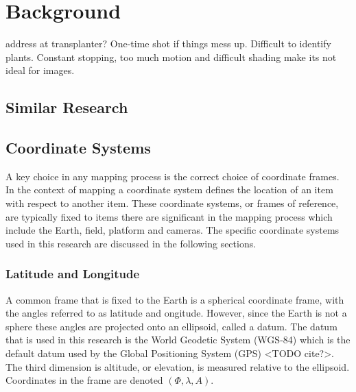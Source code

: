 
\cleardoublepage

\chapter{Background}
\label{background}

address at transplanter?  One-time shot if things mess up.  Difficult to identify plants.  Constant stopping, too much motion and difficult shading make its not ideal for images. 

\section{Similar Research}


\section{Coordinate Systems}

A key choice in any mapping process is the correct choice of coordinate frames.  In the context of mapping a coordinate system defines the location of an item with respect to another item.  These coordinate systems, or frames of reference, are typically fixed to items there are significant in the mapping process which include the Earth, field, platform and cameras.  The specific coordinate systems used in this research are discussed in the following sections.

\subsection{Latitude and Longitude}

A common frame that is fixed to the Earth is a spherical coordinate frame, with the angles referred to as latitude and ongitude. However, since the Earth is not a sphere these angles are projected onto an ellipsoid, called a datum.  The datum that is used in this research is the World Geodetic System (WGS-84) which is the default datum used by the Global Positioning System (GPS) <TODO cite?>.  The third dimension is altitude, or elevation, is measured relative to the ellipsoid.  Coordinates in the frame are denoted $(\Phi, \lambda, A)$.

